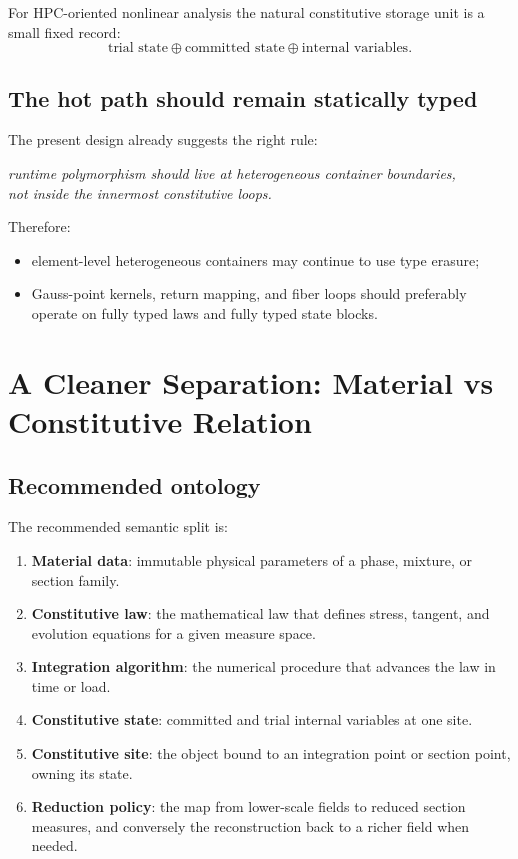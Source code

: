 For HPC-oriented nonlinear analysis the natural constitutive storage unit is a
small fixed record:
\[
\text{trial state} \oplus \text{committed state} \oplus \text{internal variables}.
\]

\subsection{The hot path should remain statically typed}

The present design already suggests the right rule:
\begin{center}
\emph{runtime polymorphism should live at heterogeneous container boundaries,}\\
\emph{not inside the innermost constitutive loops.}
\end{center}

Therefore:
\begin{itemize}
  \item element-level heterogeneous containers may continue to use type
        erasure;
  \item Gauss-point kernels, return mapping, and fiber loops should preferably
        operate on fully typed laws and fully typed state blocks.
\end{itemize}

\section{A Cleaner Separation: Material vs Constitutive Relation}

\subsection{Recommended ontology}

The recommended semantic split is:
\begin{enumerate}
  \item \textbf{Material data}: immutable physical parameters of a phase,
        mixture, or section family.
  \item \textbf{Constitutive law}: the mathematical law that defines stress,
        tangent, and evolution equations for a given measure space.
  \item \textbf{Integration algorithm}: the numerical procedure that advances
        the law in time or load.
  \item \textbf{Constitutive state}: committed and trial internal variables at
        one site.
  \item \textbf{Constitutive site}: the object bound to an integration point
        or section point, owning its state.
  \item \textbf{Reduction policy}: the map from lower-scale fields to reduced
        section measures, and conversely the reconstruction back to a richer
        field when needed.
\end{enumerate}

